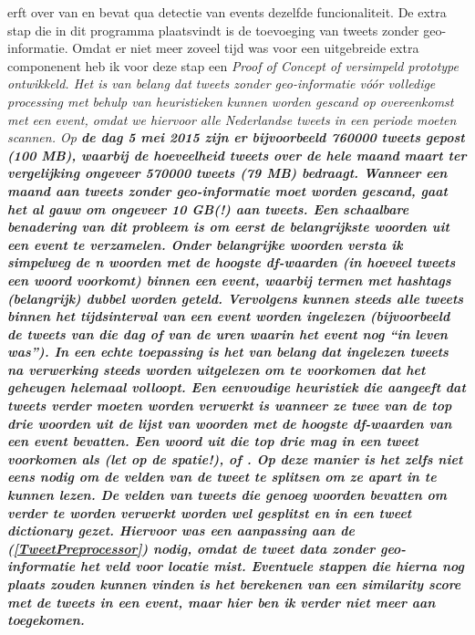 {{ erft over van  en bevat qua detectie van 
events dezelfde funcionaliteit. De extra stap die in dit programma plaatsvindt 
is de toevoeging van tweets zonder geo-informatie. Omdat er niet meer zoveel 
tijd was voor een uitgebreide extra componenent heb ik voor deze stap een \it{Proof 
of Concept} of versimpeld prototype ontwikkeld.
\vl
Het is van belang dat tweets zonder geo-informatie vóór volledige processing met 
behulp van \it{heuristieken} kunnen worden gescand op overeenkomst met een event, 
omdat we hiervoor \it{alle} Nederlandse tweets in een periode moeten scannen. Op \bf{de 
dag} 5 mei 2015 zijn er bijvoorbeeld 760000 tweets gepost (100 MB), waarbij de 
hoeveelheid tweets over \bf{de hele maand} maart ter vergelijking ongeveer 570000 
tweets (79 MB) bedraagt. Wanneer een maand aan tweets zonder geo-informatie moet 
worden gescand, gaat het al gauw om ongeveer 10 GB(!) aan tweets.
\vl
Een schaalbare benadering van dit probleem is om eerst de belangrijkste woorden 
uit een event te verzamelen. Onder belangrijke woorden versta ik simpelweg de n 
woorden met de hoogste \it{df-waarden} (in hoeveel tweets een woord voorkomt) binnen 
een event, waarbij termen met hashtags (belangrijk) dubbel worden geteld. Vervolgens
kunnen steeds alle tweets binnen het tijdsinterval van een event worden ingelezen 
(bijvoorbeeld de tweets van die dag of van de uren waarin het event nog ``in leven
was''). In een echte toepassing is het van belang dat ingelezen tweets na 
verwerking steeds worden uitgelezen om te voorkomen dat het geheugen helemaal volloopt. 
\vl
Een eenvoudige heuristiek die aangeeft dat tweets verder moeten worden verwerkt 
is wanneer ze twee van de top drie woorden uit de lijst van woorden met de 
hoogste df-waarden van een event bevatten. Een woord uit die top drie mag in een 
tweet voorkomen als  (let op de spatie!),  of . Op deze 
manier is het zelfs niet eens nodig om de velden van de tweet te splitsen om ze 
apart in te kunnen lezen. De velden van tweets die genoeg woorden bevatten om 
verder te worden verwerkt worden wel gesplitst en in een tweet dictionary gezet. 
Hiervoor was een aanpassing aan de  (\ref{TweetPreprocessor}) nodig, omdat de 
tweet data zonder geo-informatie het veld voor locatie mist. Eventuele stappen 
die hierna nog plaats zouden kunnen vinden is het berekenen van een \it{similarity 
score} met de tweets in een event, maar hier ben ik verder niet meer aan 
toegekomen.

\label{eventvis}

}}
